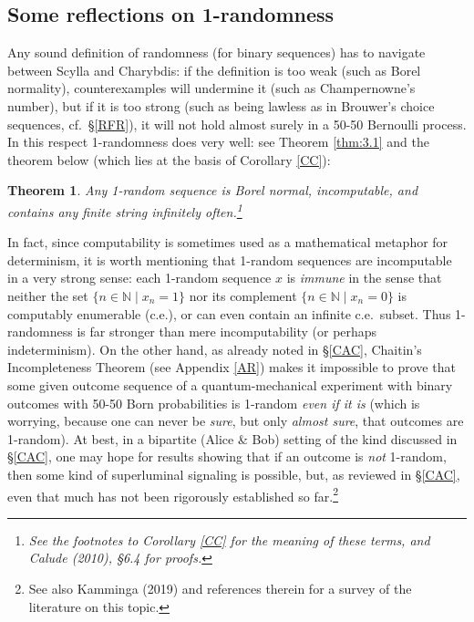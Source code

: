 \documentclass[12pt]{article}
\numberwithin{equation}{section}
\newcommand{\N}{{\mathbb N}} \newcommand{\R}{{\mathbb R}}
\newtheorem{theorem}[definition]{Theorem}
\begin{document}
\subsection*{Some reflections on 1-randomness}
Any sound definition of randomness (for binary sequences) has to navigate between Scylla and Charybdis: if the definition is too weak (such as Borel normality), counterexamples will undermine it (such as Champernowne's number), but if it is too strong (such as being lawless as in Brouwer's choice sequences, cf.\ \S\ref{RFR}), it will not hold almost surely in a 50-50 Bernoulli process.
 In this respect 1-randomness does very well: see Theorem \ref{thm:3.1} and the theorem below (which  lies at the basis of Corollary \ref{CC}):
\begin{theorem}\label{PRS}
Any 1-random sequence is  Borel normal, incomputable, and contains any finite string infinitely often.\footnote{See the footnotes to Corollary \ref{CC} for the meaning of these terms, and  Calude (2010), \S 6.4 for proofs. }
\end{theorem}
In fact, since computability is sometimes used  as a mathematical metaphor for determinism, it is worth mentioning that 1-random sequences  are incomputable in a very strong sense: each 1-random sequence $x$  is \emph{immune} in the sense that neither 
the set $\{n\in\N\mid x_n=1\}$ nor its complement  $\{n\in\N\mid x_n=0\}$ is computably enumerable (c.e.), or can even contain an infinite c.e.\ subset. Thus 1-randomness is far stronger than mere incomputability (or perhaps indeterminism).
On the other hand, as already noted in \S\ref{CAC},  Chaitin's Incompleteness Theorem (see Appendix \ref{AR}) makes it impossible to prove that some given outcome sequence of a quantum-mechanical experiment with binary outcomes with 50-50 Born probabilities is 1-random \emph{even if it is} (which is worrying, because one can never be \emph{sure}, but only \emph{almost sure}, that outcomes are 1-random). At best, in a bipartite (Alice \& Bob) setting of the kind discussed in \S\ref{CAC}, one may hope for results showing that if an outcome is \emph{not} 1-random, then some kind of superluminal signaling is possible, but, as reviewed in \S\ref{CAC}, even that much has not been rigorously established so far.\footnote{See also Kamminga (2019) and references therein for a survey of the literature on this topic.} 
\end{document}

